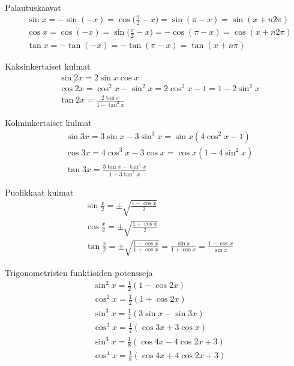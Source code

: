 Palautuskaavat \cite[s. 31]{MAOL}
\begin{align*}
& \sin x = - \sin(-x) = \cos \Big( \frac{\pi}{2} - x \Big) = \sin(\pi -x) = \sin(x + n2\pi) \\
& \cos x = \cos(-x) = \sin \Big( \frac{\pi}{2} - x \Big) = -\cos(\pi-x) = \cos(x + n2\pi) \\
& \tan x = - \tan(-x) = -\tan(\pi - x) = \tan(x + n\pi)
\end{align*}

Kaksinkertaiset kulmat \cite[s. 32]{MAOL}
\begin{align*}
& \sin 2x = 2 \sin x \cos x \\
& \cos 2x = \cos^2 x - \sin^2 x = 2 \cos^2 x - 1 = 1 - 2 \sin^2 x \\
& \tan 2x = \frac{2 \tan x}{1 - \tan^2 x}
\end{align*}

Kolminkertaiset kulmat \cite[s. 32]{MAOL}
\begin{align*}
& \sin 3x = 3 \sin x - 3 \sin^3 x = \sin x (4 \cos^2 x - 1) \\
& \cos 3x = 4 \cos^3 x - 3 \cos x = \cos x (1 - 4 \sin^2 x ) \\
& \tan 3x = \frac{3 \tan x - \tan^3 x}{1 - 3 \tan^2 x}
\end{align*}

Puolikkaat kulmat \cite[s. 32]{MAOL}
\begin{align*}
& \sin \frac{x}{2} = \pm \sqrt{\frac{1 - \cos x}{2}} \\
& \cos \frac{x}{2} = \pm \sqrt{\frac{1 + \cos x}{2}} \\
& \tan \frac{x}{2} = \pm \sqrt{\frac{1 - \cos x}{1 + \cos x}} = \frac{\sin x}{1 + \cos x} = \frac{1 - \cos x}{\sin x}
\end{align*}

Trigonometristen funktioiden potensseja \cite[s. 33]{MAOL}
\begin{align*}
& \sin^2 x = \frac{1}{2} (1- \cos 2x) \\
& \cos^2 x = \frac{1}{2} (1+ \cos 2x) \\
& \sin^3 x = \frac{1}{4} (3 \sin x - \sin 3x) \\
& \cos^3 x = \frac{1}{4} (\cos 3x + 3 \cos x) \\
& \sin^3 x = \frac{1}{8} (\cos 4x - 4 \cos 2x + 3) \\
& \cos^4 x = \frac{1}{8} (\cos 4x + 4 \cos 2x + 3)
\end{align*}

